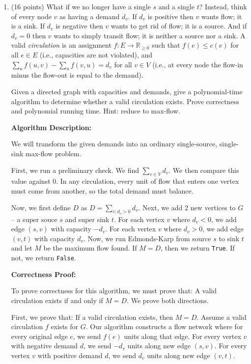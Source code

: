 \documentclass[11pt]{article}
\begin{document}
\begin{enumerate}
\item (16 points) What if we no longer have a single $s$ and a single $t$? Instead, think of every node $v$ as having a demand $d_v$. 
If $d_v$ is positive then $v$ wants flow; it is a sink. If $d_v$ is negative then $v$ wants to get rid of flow; it is a source. 
And if $d_v = 0$ then $v$ wants to simply transit flow; it is neither a source nor a sink. A valid \emph{circulation} is an assignment 
$f : E \rightarrow \mathbb{R}_{\geq 0}$ such that $f(e) \leq c(e)$ for all $e \in E$ (i.e., capacities are not violated), 
and $\sum_{u} f(u,v) - \sum_{u} f(v,u) = d_v$ for all $v \in V$ (i.e., at every node the flow-in minus the flow-out is equal to the demand).

Given a directed graph with capacities and demands, give a polynomial-time algorithm to determine whether a valid circulation exists. 
Prove correctness and polynomial running time. Hint: reduce to max-flow.

\bigbreak

\textbf{Algorithm Description:}

We will transform the given demands into an ordinary single-source, single-sink max-flow problem. 

First, we run a preliminary check. We find $\sum_{v \in V} d_v$. We then compare this value against $0$. In any circulation, 
every unit of flow that enters one vertex must come from another, so the total demand must balance.

Now, we first define $D$ as $D = \sum_{v: d_v > 0} d_v$. Next, we add $2$ new vertices to $G$ -- a super souce $s$ and super sink $t$. 
For each vertex $v$ where $d_v < 0$, we add edge $(s, v)$ with capacity $-d_v$. For each vertex $v$ where $d_v > 0$, we add edge $(v, t)$ 
with capacity $d_v$. Now, we run Edmonds-Karp from source $s$ to sink $t$ and let $M$ be the maximum flow found. 
If $M = D$, then we return \texttt{True}. If not, we return \texttt{False}.

\bigbreak

\textbf{Correctness Proof:}

To prove correctness for this algorithm, we must prove that: A valid circulation exists if and only if $M = D$. 
We prove both directions.

\medbreak

First, we prove that: If a valid circulation exists, then $M = D$. Assume a valid circulation $f$ exists for $G$. 
Our algorithm constructs a flow network where for every original edge $e$, we send $f(e)$ units along that edge. 
For every vertex $v$ with negative demand $d$, we send $-d_v$ units along new edge $(s, v)$. 
For every vertex $v$ with positive demand $d$, we send $d_v$ units along new edge $(v, t)$. 


\end{enumerate}
\end{document}
